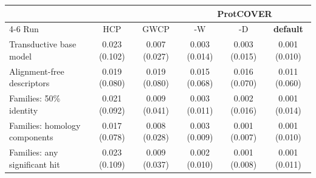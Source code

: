 \begin{tabular}{lccccc}
\toprule
 & & & \multicolumn{3}{c}{ProtCOVER} \\
\cmidrule(lr){4-6}
Run & HCP & GWCP & -W & -D & \textbf{default} \\
\midrule
Transductive base model & 0.023 (0.102) & 0.007 (0.027) & 0.003 (0.014) & 0.003 (0.015) & 0.001 (0.010) \\
Alignment-free descriptors & 0.019 (0.080) & 0.019 (0.080) & 0.015 (0.068) & 0.016 (0.070) & 0.011 (0.060) \\
Families: 50\% identity & 0.021 (0.092) & 0.009 (0.041) & 0.003 (0.011) & 0.002 (0.016) & 0.001 (0.014) \\
Families: homology components & 0.017 (0.078) & 0.008 (0.028) & 0.003 (0.009) & 0.001 (0.007) & 0.001 (0.010) \\
Families: any significant hit & 0.023 (0.109) & 0.009 (0.037) & 0.002 (0.010) & 0.001 (0.008) & 0.001 (0.011) \\
\bottomrule
\end{tabular}
